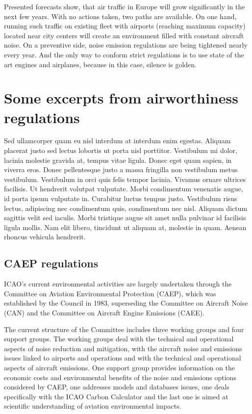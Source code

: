 Presented forecasts show, that air traffic in Europe will grow significantly in the next few years. With no actions taken, two paths are available. On one hand, running such traffic on existing fleet with airports (reaching maximum capacity) located near city centers will create an environment filled with constant aircraft noise. On a preventive side, noise emission regulations are being tightened nearly every year. And the only way to conform strict regulations is to use state of the art engines and airplanes, because in this case, silence is golden.

\section{Some excerpts from airworthiness regulations}

Sed ullamcorper quam eu nisl interdum at interdum enim egestas. Aliquam placerat justo sed lectus lobortis ut porta nisl porttitor. Vestibulum mi dolor, lacinia molestie gravida at, tempus vitae ligula. Donec eget quam sapien, in viverra eros. Donec pellentesque justo a massa fringilla non vestibulum metus vestibulum. Vestibulum in orci quis felis tempor lacinia. Vivamus ornare ultrices facilisis. Ut hendrerit volutpat vulputate. Morbi condimentum venenatis augue, id porta ipsum vulputate in. Curabitur luctus tempus justo. Vestibulum risus lectus, adipiscing nec condimentum quis, condimentum nec nisl. Aliquam dictum sagittis velit sed iaculis. Morbi tristique augue sit amet nulla pulvinar id facilisis ligula mollis. Nam elit libero, tincidunt ut aliquam at, molestie in quam. Aenean rhoncus vehicula hendrerit.

\subsection{CAEP regulations}

ICAO's current environmental activities are largely undertaken through the Committee on Aviation Environmental Protection (CAEP), which was established by the Council in 1983, superseding the Committee on Aircraft Noise (CAN) and the Committee on Aircraft Engine Emissions (CAEE).

The current structure of the Committee includes three working groups and four support groups. The working groups deal with the technical and operational aspects of noise reduction and mitigation, with the aircraft noise and emissions issues linked to airports and operations and with the technical and operational aspects of aircraft emissions. One support group provides information on the economic costs and environmental benefits of the noise and emissions options considered by CAEP, one addresses models and databases issues, one deals specifically with the ICAO Carbon Calculator and the last one is aimed at scientific understanding of aviation environmental impacts.
 
